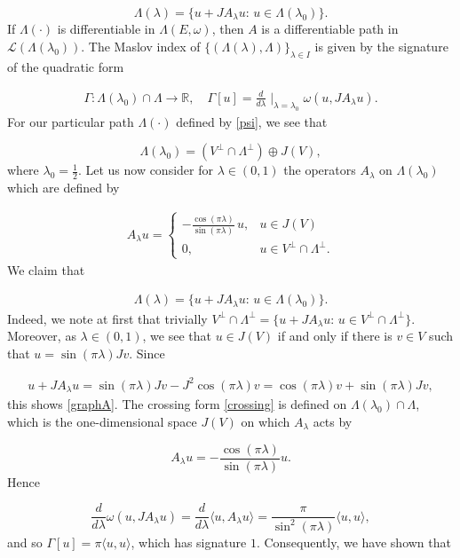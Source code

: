 \documentclass[a4paper,10pt]{article}
\begin{document}
\[\Lambda(\lambda)=\{u+JA_\lambda u:\,u\in\Lambda(\lambda_0)\}.\]
If $\Lambda(\cdot)$ is differentiable in $\Lambda(E,\omega)$, then $A$ is a differentiable path in $\mathcal{L}(\Lambda(\lambda_0))$. The Maslov index of $\{(\Lambda(\lambda),\Lambda)\}_{\lambda\in I}$ is given by the signature of the quadratic form

\begin{align}\label{crossing}
\Gamma:\Lambda(\lambda_0)\cap\Lambda\rightarrow\mathbb{R},\quad \Gamma[u]=\frac{d}{d\lambda}\mid_{\lambda=\lambda_0}\omega(u,J A_\lambda u).
\end{align}
For our particular path $\Lambda(\cdot)$ defined by \eqref{psi}, we see that

\[\Lambda(\lambda_0)=(V^\perp\cap\Lambda^\perp)\oplus J(V),\]
where $\lambda_0=\frac{1}{2}$. Let us now consider for $\lambda\in(0,1)$ the operators $A_\lambda$ on $\Lambda(\lambda_0)$ which are defined by 

\begin{align*}
A_\lambda u=\begin{cases}
-\frac{\cos(\pi\lambda)}{\sin(\pi\lambda)}\,u, &u\in J(V)\\
0, &u\in V^\perp\cap\Lambda^\perp.
\end{cases}
\end{align*}
We claim that 

\begin{align}\label{graphA}
\Lambda(\lambda)=\{u+JA_\lambda u:\,u\in\Lambda(\lambda_0)\}.
\end{align}
Indeed, we note at first that trivially $V^\perp\cap\Lambda^\perp=\{u+JA_\lambda u:\, u\in V^\perp\cap\Lambda^\perp\}$. Moreover, as $\lambda\in(0,1)$, we see that $u\in J(V)$ if and only if there is $v\in V$ such that $u=\sin(\pi\lambda)Jv$. Since 

\begin{align*}
u+JA_\lambda u=\sin(\pi\lambda)Jv-J^2\cos(\pi\lambda)v=\cos(\pi\lambda)v+\sin(\pi\lambda)Jv,
\end{align*}
this shows \eqref{graphA}. The crossing form \eqref{crossing} is defined on $\Lambda(\lambda_0)\cap\Lambda$, which is the one-dimensional space $J(V)$ on which $A_\lambda$ acts by 

\[A_\lambda u=-\frac{\cos(\pi\lambda)}{\sin(\pi\lambda)}u.\]
Hence

\[\frac{d}{d\lambda}\omega(u,JA_\lambda u)=\frac{d}{d\lambda}\langle u,A_\lambda u\rangle =\frac{\pi}{\sin^2(\pi\lambda)} \langle u,u\rangle,\]
and so $\Gamma[u]=\pi \langle u,u\rangle $, which has signature $1$. Consequently, we have shown that 
\end{document}
